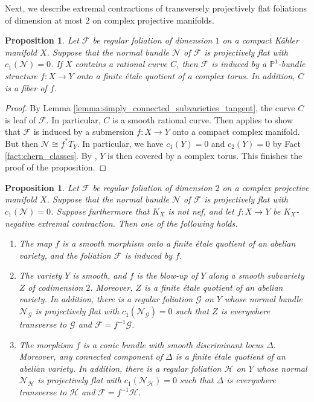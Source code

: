 \documentclass[english,10pt]{amsart}
\newcommand{\cF}{\mathcal{F}}
\newcommand{\cG}{\mathcal{G}}
\newcommand{\cH}{\mathcal{H}}
\newcommand{\sN}{\mathscr{N}}
\newtheorem{prop}[thm]{Proposition}
\theoremstyle{definition}
\theoremstyle{remark}
\numberwithin{equation}{section}
\begin{document}
Next, we describe extremal contractions of transversely projectively flat foliations of dimension at most $2$ on complex projective manifolds. 

\begin{prop}\label{prop:rational_leaves}
Let $\cF$ be regular foliation of dimension $1$ on a compact K\"ahler manifold $X$. Suppose that the normal bundle $\sN$ of $\cF$ is projectively flat with $c_1(\sN)=0$. If $X$ contains a rational curve $C$, then $\cF$ is induced by a $\mathbb{P}^1$-bundle structure $f\colon X \to Y$ onto a finite \'etale quotient of a complex torus. In addition, $C$ is a fiber of $f$.
\end{prop}

\begin{proof}
By Lemma \ref{lemma:simply_connected_subvarieties_tangent}, the curve $C$ is leaf of $\cF$. In particular, $C$ is a smooth rational curve. Then \cite[Corollary 2.11]{hoering_split} applies to show that $\cF$ is induced by a submersion $f \colon X \to Y$ onto a compact complex manifold. But then $\sN \cong f^*T_Y$. In particular, we have $c_1(Y)=0$ and $c_2(Y)=0$ by Fact \ref{fact:chern_classes}. By \cite[Chapter IV Corollary 4.15]{kobayashi_diff_geom_vb}, $Y$ is then covered by a complex torus. This finishes the proof of the proposition.
\end{proof}

\begin{prop}\label{prop:dimension_two_mmp}
Let $\cF$ be regular foliation of dimension $2$ on a complex projective manifold $X$. Suppose that the normal bundle $\sN$ of $\cF$ is projectively flat with $c_1(\sN)=0$. Suppose furthermore that $K_X$ is not nef, and let $f \colon X \to Y$ be $K_X$-negative extremal contraction. Then one of the following holds.
\begin{enumerate}
\item The map $f$ is a smooth morphism onto a finite \'etale quotient of an abelian variety, and the foliation $\cF$ is induced by $f$.
\item The variety $Y$ is smooth, and $f$ is the blow-up of $Y$ along a smooth subvariety $Z$ of codimension $2$. Moreover, $Z$ is a finite \'etale quotient of an abelian variety. In addition, there is a regular foliation $\cG$ on $Y$ whose normal bundle $\sN_\cG$ is projectively flat with $c_1(\sN_\cG)=0$ such that $Z$ is everywhere transverse to $\cG$ and $\cF=f^{-1}\cG$.
\item The morphism $f$ is a conic bundle with smooth discriminant locus $\Delta$. Moreover, any connected component of $\Delta$ is a finite \'etale quotient of an abelian variety. In addition, there is a regular foliation $\cH$ on $Y$ whose normal $\sN_\cH$ is projectively flat with $c_1(\sN_\cH)=0$ such that $\Delta$ is everywhere transverse to $\cH$ and $\cF=f^{-1}\cH$.
\end{enumerate}
\end{prop}
\end{document}

